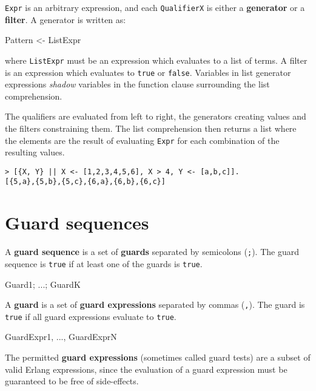 \begin{erlang}
\end{erlang}

\texttt{Expr} is an arbitrary expression, and each \texttt{QualifierX}
is either a \textbf{generator} or a \textbf{filter}. A generator is
written as:

\begin{erlang}
Pattern <- ListExpr
\end{erlang}

where \texttt{ListExpr} must be an expression which evaluates to a
list of terms. A filter is an expression which evaluates to
\texttt{true} or \texttt{false}. Variables in list generator
expressions \textit{shadow} variables in the function clause
surrounding the list comprehension.

The qualifiers are evaluated from left to right, the generators
creating values and the filters constraining them. The list
comprehension then returns a list where the elements are the result of
evaluating \texttt{Expr} for each combination of the resulting values.

\begin{verbatim}
> [{X, Y} || X <- [1,2,3,4,5,6], X > 4, Y <- [a,b,c]].
[{5,a},{5,b},{5,c},{6,a},{6,b},{6,c}]
\end{verbatim}


\section{Guard sequences}
A \textbf{guard sequence} is a set of \textbf{guards} separated by
semicolons (\texttt{;}). The guard sequence is \texttt{true} if at
least one of the guards is \texttt{true}.

\begin{erlang}
Guard1; ...; GuardK
\end{erlang}

A \textbf{guard} is a set of \textbf{guard expressions} separated by
commas (\texttt{,}). The guard is \texttt{true} if all guard
expressions evaluate to \texttt{true}.

\begin{erlang}
GuardExpr1, ..., GuardExprN
\end{erlang}

The permitted \textbf{guard expressions} (sometimes called guard
tests) are a subset of valid Erlang expressions, since the
evaluation of a guard expression must be guaranteed to be free of side-effects.

